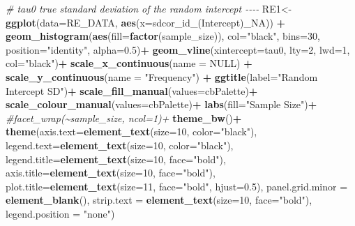 \documentclass[
]{article}
\newenvironment{Shaded}{\begin{snugshade}}{\end{snugshade}}
\newcommand{\AttributeTok}[1]{\textcolor[rgb]{0.13,0.29,0.53}{#1}}
\newcommand{\CommentTok}[1]{\textcolor[rgb]{0.56,0.35,0.01}{\textit{#1}}}
\newcommand{\ConstantTok}[1]{\textcolor[rgb]{0.56,0.35,0.01}{#1}}
\newcommand{\DecValTok}[1]{\textcolor[rgb]{0.00,0.00,0.81}{#1}}
\newcommand{\FloatTok}[1]{\textcolor[rgb]{0.00,0.00,0.81}{#1}}
\newcommand{\FunctionTok}[1]{\textcolor[rgb]{0.13,0.29,0.53}{\textbf{#1}}}
\newcommand{\NormalTok}[1]{#1}
\newcommand{\OtherTok}[1]{\textcolor[rgb]{0.56,0.35,0.01}{#1}}
\newcommand{\SpecialCharTok}[1]{\textcolor[rgb]{0.81,0.36,0.00}{\textbf{#1}}}
\newcommand{\StringTok}[1]{\textcolor[rgb]{0.31,0.60,0.02}{#1}}
\begin{document}
\begin{Shaded}
\begin{Highlighting}[]
\CommentTok{\# tau0  true standard deviation of the random intercept {-}{-}{-}{-}}
\NormalTok{RE1}\OtherTok{\textless{}{-}}\FunctionTok{ggplot}\NormalTok{(}\AttributeTok{data=}\NormalTok{RE\_DATA, }\FunctionTok{aes}\NormalTok{(}\AttributeTok{x=}\StringTok{\textasciigrave{}}\AttributeTok{sdcor\_id\_(Intercept)\_NA}\StringTok{\textasciigrave{}}\NormalTok{)) }\SpecialCharTok{+}
  \FunctionTok{geom\_histogram}\NormalTok{(}\FunctionTok{aes}\NormalTok{(}\AttributeTok{fill=}\FunctionTok{factor}\NormalTok{(sample\_size)), }\AttributeTok{col=}\StringTok{"black"}\NormalTok{, }\AttributeTok{bins=}\DecValTok{30}\NormalTok{,}
                 \AttributeTok{position=}\StringTok{"identity"}\NormalTok{, }\AttributeTok{alpha=}\FloatTok{0.5}\NormalTok{)}\SpecialCharTok{+}
  \FunctionTok{geom\_vline}\NormalTok{(}\AttributeTok{xintercept=}\NormalTok{tau0, }\AttributeTok{lty=}\DecValTok{2}\NormalTok{, }\AttributeTok{lwd=}\DecValTok{1}\NormalTok{, }\AttributeTok{col=}\StringTok{"black"}\NormalTok{)}\SpecialCharTok{+}
  \FunctionTok{scale\_x\_continuous}\NormalTok{(}\AttributeTok{name =} \ConstantTok{NULL}\NormalTok{) }\SpecialCharTok{+}
  \FunctionTok{scale\_y\_continuous}\NormalTok{(}\AttributeTok{name =} \StringTok{"Frequency"}\NormalTok{) }\SpecialCharTok{+}
  \FunctionTok{ggtitle}\NormalTok{(}\AttributeTok{label=}\StringTok{"Random Intercept SD"}\NormalTok{)}\SpecialCharTok{+}
  \FunctionTok{scale\_fill\_manual}\NormalTok{(}\AttributeTok{values=}\NormalTok{cbPalette)}\SpecialCharTok{+}
  \FunctionTok{scale\_colour\_manual}\NormalTok{(}\AttributeTok{values=}\NormalTok{cbPalette)}\SpecialCharTok{+}
  \FunctionTok{labs}\NormalTok{(}\AttributeTok{fill=}\StringTok{"Sample Size"}\NormalTok{)}\SpecialCharTok{+}
  \CommentTok{\#facet\_wrap(\textasciitilde{}sample\_size, ncol=1)+}
  \FunctionTok{theme\_bw}\NormalTok{()}\SpecialCharTok{+}
  \FunctionTok{theme}\NormalTok{(}\AttributeTok{axis.text=}\FunctionTok{element\_text}\NormalTok{(}\AttributeTok{size=}\DecValTok{10}\NormalTok{, }\AttributeTok{color=}\StringTok{"black"}\NormalTok{),}
        \AttributeTok{legend.text=}\FunctionTok{element\_text}\NormalTok{(}\AttributeTok{size=}\DecValTok{10}\NormalTok{, }\AttributeTok{color=}\StringTok{"black"}\NormalTok{),}
        \AttributeTok{legend.title=}\FunctionTok{element\_text}\NormalTok{(}\AttributeTok{size=}\DecValTok{10}\NormalTok{, }\AttributeTok{face=}\StringTok{"bold"}\NormalTok{),}
        \AttributeTok{axis.title=}\FunctionTok{element\_text}\NormalTok{(}\AttributeTok{size=}\DecValTok{10}\NormalTok{, }\AttributeTok{face=}\StringTok{"bold"}\NormalTok{),}
        \AttributeTok{plot.title=}\FunctionTok{element\_text}\NormalTok{(}\AttributeTok{size=}\DecValTok{11}\NormalTok{, }\AttributeTok{face=}\StringTok{"bold"}\NormalTok{, }\AttributeTok{hjust=}\FloatTok{0.5}\NormalTok{),}
        \AttributeTok{panel.grid.minor =} \FunctionTok{element\_blank}\NormalTok{(),}
        \AttributeTok{strip.text =} \FunctionTok{element\_text}\NormalTok{(}\AttributeTok{size=}\DecValTok{10}\NormalTok{, }\AttributeTok{face=}\StringTok{"bold"}\NormalTok{),}
        \AttributeTok{legend.position =} \StringTok{"none"}\NormalTok{)}


\end{Highlighting}
\end{Shaded}
\end{document}
